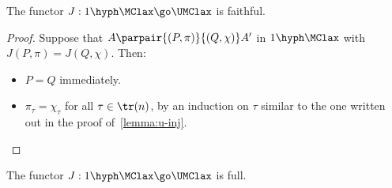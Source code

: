\begin{lemma}
The functor $J: 1\hyph\MClax \go \UMClax$ is faithful.
\end{lemma}

\begin{proof}
Suppose that $A \parpair{(P,\pi)}{(Q,\chi)} A'$ in $1\hyph\MClax$ with
$J(P,\pi) = J(Q,\chi)$.  Then:
%
\begin{itemize}
\item $P=Q$ immediately.
\item $\pi_\tau = \chi_\tau$ for all $\tau\in\tr(n)$, by an induction on
$\tau$ similar to the one written out in the proof of~\ref{lemma:u-inj}.
\done
\end{itemize}
\end{proof}

\begin{lemma}	
The functor $J: 1\hyph\MClax \go \UMClax$ is full.
\end{lemma}

